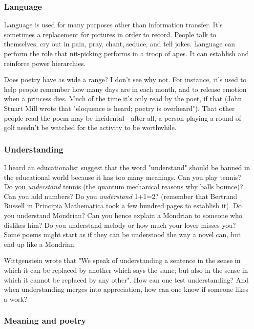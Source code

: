 \documentclass[11pt]{article}
\begin{document}
\subsubsection*{Language} 

Language is used for many purposes other than information transfer. It's
sometimes a replacement for pictures in order to record. People talk to
themselves, cry out in pain, pray, chant, seduce, and tell jokes. Language can perform
the role that nit-picking performs in a troop of apes. It can establish and reinforce power hierarchies.  


Does poetry have as wide a range? I don't see why not. For instance,
it's used to help people remember how many days are in each month, and to release emotion when a princess dies. Much of the
time it's only read by the poet, if that (John Stuart Mill wrote that
"eloquence is heard; poetry is overheard"). That other people read the poem
may be incidental - after all, a person playing a round of golf needn't be
watched for the activity to be worthwhile.

\subsubsection*{Understanding} 

I heard an educationalist suggest that the word "understand"
should be banned in the educational world because it has too many meanings.
Can you play tennis? Do you \textit{understand} tennis (the quantum mechanical reasons why balls bounce)? Can you add numbers?
Do you \textit{understand} 1+1=2? (remember that Bertrand Russell in Principia
Mathematica took a few hundred pages to establish it). Do you understand Mondrian? Can you hence explain a Mondrian to someone who
dislikes him? Do you understand melody or how much your lover
misses you? Some poems might start as if they can be understood the way a
novel can, but end up like a Mondrian.

 Wittgenstein wrote that "We speak of                                                              
understanding a sentence in the sense in which it can be replaced by                                  
another which says the same; but also in the sense in which it cannot be                              
replaced by any other". How can one test understanding? And when
understanding merges into appreciation, how can one know if someone likes a
work?

\subsubsection*{Meaning and poetry} 
\end{document}
